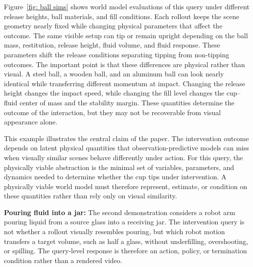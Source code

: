 \documentclass{article}
\begin{document}
Figure~\ref{fig: ball sims} shows world model evaluations of this query under different release heights, ball materials, and fill conditions. Each rollout keeps the scene geometry nearly fixed while changing physical parameters that affect the outcome. The same visible setup can tip or remain upright depending on the ball mass, restitution, release height, fluid volume, and fluid response. These parameters shift the release conditions separating tipping from non-tipping outcomes.
The important point is that these differences are physical rather than visual. A steel ball, a wooden ball, and an aluminum ball can look nearly identical while transferring different momentum at impact. Changing the release height changes the impact speed, while changing the fill level changes the cup–fluid center of mass and the stability margin. These quantities determine the outcome of the interaction, but they may not be recoverable from visual appearance alone.

This example illustrates the central claim of the paper. The intervention outcome depends on latent physical quantities that observation-predictive models can miss when visually similar scenes behave differently under action. For this query, the physically viable abstraction is the minimal set of variables, parameters, and dynamics needed to determine whether the cup tips under intervention. A physically viable world model must therefore represent, estimate, or condition on these quantities rather than rely only on visual similarity.

\textbf{Pouring fluid into a jar:}
The second demonstration considers a robot arm pouring liquid from a source glass into a receiving jar. The intervention query is not whether a rollout visually resembles pouring, but which robot motion transfers a target volume, such as half a glass, without underfilling, overshooting, or spilling. The query-level response is therefore an action, policy, or termination condition rather than a rendered video.
\end{document}
